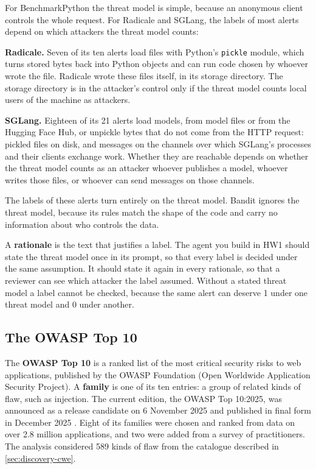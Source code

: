 For BenchmarkPython the threat model is simple, because an anonymous client controls the whole
request. For Radicale and SGLang, the labels of most alerts depend on which attackers the threat
model counts:
\bi
\item \textbf{Radicale.} Seven of its ten alerts load files with Python's \texttt{pickle} module,
which turns stored bytes back into Python objects and can run code chosen by whoever wrote the file.
Radicale wrote these files itself, in its storage directory. The storage directory is in the
attacker's control only if the threat model counts local users of the machine as attackers.
\item \textbf{SGLang.} Eighteen of its 21 alerts load models, from model files or from the Hugging
Face Hub, or unpickle bytes that do not come from the HTTP request: pickled files on disk, and
messages on the channels over which SGLang's processes and their clients exchange work. Whether
they are reachable depends on whether the threat model counts as an attacker whoever publishes a
model, whoever writes those files, or whoever can send messages on those channels.
\ei

The labels of these alerts turn entirely on the threat model. Bandit ignores the threat model,
because its rules match the shape of the code and carry no information about who controls the data.

A \textbf{rationale} is the text that justifies a label. The agent you build in HW1 should state the
threat model once in its prompt, so that every label is decided under the same assumption. It should
state it again in every rationale, so that a reviewer can see which attacker the label assumed.
Without a stated threat model a label cannot be checked, because the same alert can deserve 1 under
one threat model and 0 under another.

\subsection{The OWASP Top 10}
\label{sec:discovery-top10}

The \textbf{OWASP Top 10} is a ranked list of the most critical security risks to web
applications, published by the OWASP Foundation (Open Worldwide Application Security Project). A
\textbf{family} is one of its ten entries: a group of related kinds of flaw, such as injection. The
current edition, the OWASP Top 10:2025, was announced as a release candidate on 6 November 2025 and
published in final form in December 2025 \citep{owasp2025top10}.
Eight of its families were chosen and ranked from data on over 2.8 million applications, and two
were added from a survey of practitioners. The analysis considered 589 kinds of flaw from the
catalogue described in \cref{sec:discovery-cwe}.

